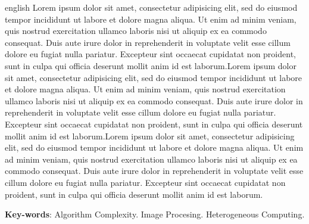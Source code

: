 \documentclass[
	12pt,				%
	openright,			%
	oneside,			%
	a4paper,			%
	chapter=TITLE,		%
	section=TITLE,		%
	english,			%
	brazil				%
	]{abntex2}
\begin{document}
\begin{resumo}[Abstract]
 \begin{otherlanguage*}{english}
   	Lorem ipsum dolor sit amet, consectetur adipisicing elit, sed do eiusmod
	tempor incididunt ut labore et dolore magna aliqua. Ut enim ad minim veniam,
	quis nostrud exercitation ullamco laboris nisi ut aliquip ex ea commodo
	consequat. Duis aute irure dolor in reprehenderit in voluptate velit esse
	cillum dolore eu fugiat nulla pariatur. Excepteur sint occaecat cupidatat non
	proident, sunt in culpa qui officia deserunt mollit anim id est laborum.Lorem ipsum dolor sit amet, consectetur adipisicing elit, sed do eiusmod
	tempor incididunt ut labore et dolore magna aliqua. Ut enim ad minim veniam,
	quis nostrud exercitation ullamco laboris nisi ut aliquip ex ea commodo
	consequat. Duis aute irure dolor in reprehenderit in voluptate velit esse
	cillum dolore eu fugiat nulla pariatur. Excepteur sint occaecat cupidatat non
	proident, sunt in culpa qui officia deserunt mollit anim id est laborum.Lorem ipsum dolor sit amet, consectetur adipisicing elit, sed do eiusmod
	tempor incididunt ut labore et dolore magna aliqua. Ut enim ad minim veniam,
	quis nostrud exercitation ullamco laboris nisi ut aliquip ex ea commodo
	consequat. Duis aute irure dolor in reprehenderit in voluptate velit esse
	cillum dolore eu fugiat nulla pariatur. Excepteur sint occaecat cupidatat non
	proident, sunt in culpa qui officia deserunt mollit anim id est laborum.
   \vspace{\onelineskip}
 
   \noindent 
   \textbf{Key-words}: Algorithm Complexity. Image Procesing. Heterogeneous Computing.
 \end{otherlanguage*}
\end{resumo}

\listoffigures*
\cleardoublepage

\listoftables*
\cleardoublepage

\end{document}
